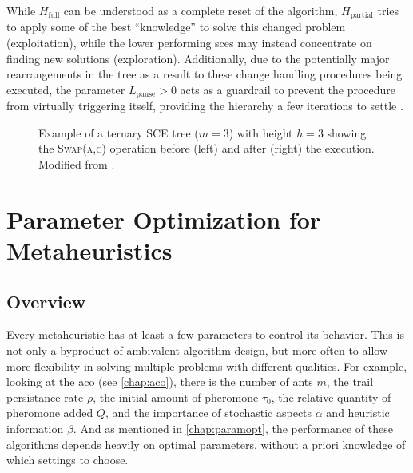 While $H_\text{full}$ can be understood as a complete reset of the algorithm, $H_\text{partial}$ tries to apply some of the best \enquote{knowledge} to solve this changed problem (exploitation), while the lower performing \glspl{sce} may instead concentrate on finding new solutions (exploration). Additionally, due to the potentially major rearrangements in the tree as a result to these change handling procedures being executed, the parameter $L_\text{pause} > 0$ acts as a guardrail to prevent the procedure from virtually triggering itself, providing the hierarchy a few iterations to settle \cite{kupfer2021hierarchical}.

\begin{figure}
\centering
{}
	\caption[Example of a ternary SCE tree showing a swap operation]{Example of a ternary SCE tree ($m = 3$) with height $h = 3$ showing the \textsc{Swap(a,c)} operation before (left) and after (right) the execution. Modified from \citet{kupfer2021hierarchical}.}
	\label{fig:ternary-tree}
\end{figure}



\section{Parameter Optimization for Metaheuristics}

\subsection{Overview}

Every metaheuristic has at least a few parameters to control its behavior. This is not only a byproduct of ambivalent algorithm design, but more often to allow more flexibility in solving multiple problems with different qualities. For example, looking at the \gls{aco} (see \ref{chap:aco}), there is the number of ants $m$, the trail persistance rate $\rho$, the initial amount of pheromone $\tau_0$, the relative quantity of pheromone added $Q$, and the importance of stochastic aspects $\alpha$ and heuristic information $\beta$. And as mentioned in \cref{chap:paramopt}, the performance of these algorithms depends heavily on optimal parameters, without a priori knowledge of which settings to choose.

